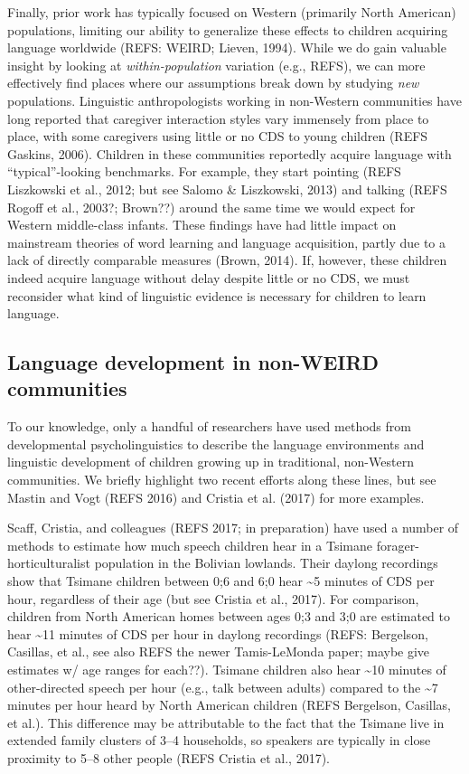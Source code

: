 \documentclass[floatsintext,man]{apa6}
\theoremstyle{definition}
\theoremstyle{definition}
\theoremstyle{definition}
\theoremstyle{remark}
\begin{document}
Finally, prior work has typically focused on Western (primarily North
American) populations, limiting our ability to generalize these effects
to children acquiring language worldwide (REFS: WEIRD; Lieven, 1994).
While we do gain valuable insight by looking at \emph{within-population}
variation (e.g., REFS), we can more effectively find places where our
assumptions break down by studying \emph{new} populations. Linguistic
anthropologists working in non-Western communities have long reported
that caregiver interaction styles vary immensely from place to place,
with some caregivers using little or no CDS to young children (REFS
Gaskins, 2006). Children in these communities reportedly acquire
language with \enquote{typical}-looking benchmarks. For example, they
start pointing (REFS Liszkowski et al., 2012; but see Salomo \&
Liszkowski, 2013) and talking (REFS Rogoff et al., 2003?; Brown??)
around the same time we would expect for Western middle-class infants.
These findings have had little impact on mainstream theories of word
learning and language acquisition, partly due to a lack of directly
comparable measures (Brown, 2014). If, however, these children indeed
acquire language without delay despite little or no CDS, we must
reconsider what kind of linguistic evidence is necessary for children to
learn language.

\subsection{Language development in non-WEIRD
communities}\label{intro-nonweird}

To our knowledge, only a handful of researchers have used methods from
developmental psycholinguistics to describe the language environments
and linguistic development of children growing up in traditional,
non-Western communities. We briefly highlight two recent efforts along
these lines, but see Mastin and Vogt (REFS 2016) and Cristia et al.
(2017) for more examples.

Scaff, Cristia, and colleagues (REFS 2017; in preparation) have used a
number of methods to estimate how much speech children hear in a Tsimane
forager-horticulturalist population in the Bolivian lowlands. Their
daylong recordings show that Tsimane children between 0;6 and 6;0 hear
\textasciitilde{}5 minutes of CDS per hour, regardless of their age (but
see Cristia et al., 2017). For comparison, children from North American
homes between ages 0;3 and 3;0 are estimated to hear \textasciitilde{}11
minutes of CDS per hour in daylong recordings (REFS: Bergelson,
Casillas, et al., see also REFS the newer Tamis-LeMonda paper; maybe
give estimates w/ age ranges for each??). Tsimane children also hear
\textasciitilde{}10 minutes of other-directed speech per hour (e.g.,
talk between adults) compared to the \textasciitilde{}7 minutes per hour
heard by North American children (REFS Bergelson, Casillas, et al.).
This difference may be attributable to the fact that the Tsimane live in
extended family clusters of 3--4 households, so speakers are typically
in close proximity to 5--8 other people (REFS Cristia et al., 2017).
\end{document}
